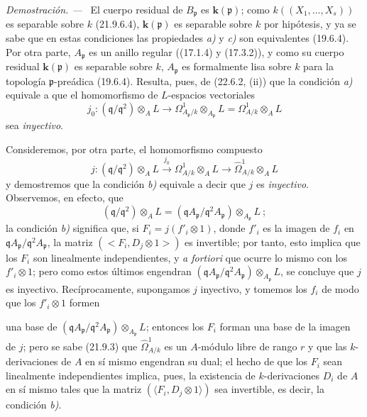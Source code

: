 \documentclass[10pt,oneside]{book}
\newcommand{\oldpage}[2][]{%
  \setcounter{footnote}{0}%
  \marginpar{\scriptsize\textbf{#1}~|~#2}\ignorespaces}
\newenvironment{proof}{%
  \par\medskip\noindent\textit{Demostración. ---\ }}{\par}
\begin{document}
\begin{proof}
El cuerpo residual de $B_{\mathfrak p}$ es $\boldsymbol k(\mathfrak p)$; como
$k((X_1,\ldots,X_s))$ es separable sobre $k$ (21.9.6.4), $\boldsymbol k(\mathfrak p)$ es
separable sobre $k$ por hipótesis, y ya se sabe que en estas condiciones las
propiedades \emph{a)} y \emph{c)} son equivalentes (19.6.4). Por otra parte,
$A_{\mathfrak p}$ es un anillo regular ((17.1.4) y (17.3.2)), y como su
cuerpo residual $\boldsymbol k(\mathfrak p)$ es separable sobre $k$, $A_{\mathfrak p}$ es
formalmente lisa sobre $k$ para la topología $\mathfrak p$-preádica
(19.6.4). Resulta, pues, de (22.6.2, (ii)) que la condición \emph{a)} equivale a que
el homomorfismo de $L$-espacios vectoriales
\begin{equation}
\label{0.22.7.2.1-es}
  j_0:(\mathfrak q/\mathfrak q^2)\otimes_AL
  \longrightarrow\Omega^1_{A_{\mathfrak p}/k}\otimes_{A_{\mathfrak p}}L
  =\Omega^1_{A/k}\otimes_AL
  \tag{22.7.2.1}
\end{equation}
sea \emph{inyectivo}.

Consideremos, por otra parte, el homomorfismo compuesto
\begin{equation}
\label{0.22.7.2.2-es}
  j:(\mathfrak q/\mathfrak q^2)\otimes_AL
  \xrightarrow{j_0}\Omega^1_{A/k}\otimes_AL
  \longrightarrow\widehat\Omega^1_{A/k}\otimes_AL
  \tag{22.7.2.2}
\end{equation}
y demostremos que la condición \emph{b)} equivale a decir que $j$ es \emph{inyectivo}. Observemos, en
efecto, que
\[
  (\mathfrak q/\mathfrak q^2)\otimes_AL
  =(\mathfrak qA_{\mathfrak p}/\mathfrak q^2A_{\mathfrak p})
  \otimes_{A_{\mathfrak p}}L~;
\]
la condición \emph{b)} significa que, si $F_i=j(f'_i\otimes1)$, donde $f'_i$ es la imagen
de $f_i$ en
$\mathfrak qA_{\mathfrak p}/\mathfrak q^2A_{\mathfrak p}$, la matriz
$(\mathopen{<}F_i,D_j\otimes1\mathclose{>})$ es invertible; por tanto, esto implica que los
$F_i$ son linealmente independientes, y \emph{a fortiori} que ocurre lo
mismo con los $f'_i\otimes1$; pero como estos últimos engendran
$(\mathfrak qA_{\mathfrak p}/\mathfrak q^2A_{\mathfrak p})
\otimes_{A_{\mathfrak p}}L$, se concluye que $j$ es inyectivo. Recíprocamente,
supongamos $j$ inyectivo, y tomemos los $f_i$ de modo que los $f'_i\otimes1$
formen

\oldpage[0\textsubscript{IV-1}]{210}

una base de
$(\mathfrak qA_{\mathfrak p}/\mathfrak q^2A_{\mathfrak p})
\otimes_{A_{\mathfrak p}}L$; entonces los $F_i$ forman una base de la imagen de
$j$; pero se sabe (21.9.3) que $\widehat\Omega^1_{A/k}$ es un $A$-módulo
libre de rango $r$ y que las $k$-derivaciones de $A$ en sí mismo engendran su
dual; el hecho de que los $F_i$ sean linealmente independientes implica, pues,
la existencia de $k$-derivaciones $D_i$ de $A$ en sí mismo tales que la matriz
$(\langle F_i,D_j\otimes1\rangle)$ sea invertible, es decir, la condición
\emph{b)}.


\end{proof}
\end{document}
